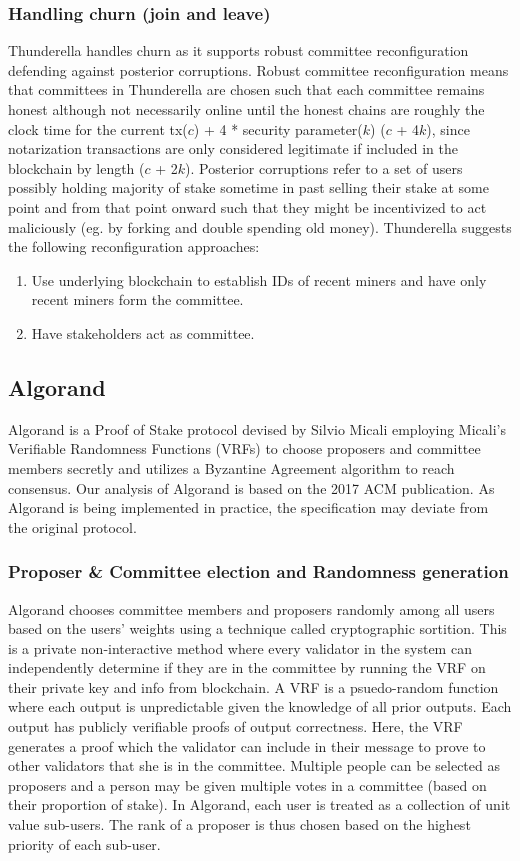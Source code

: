 \documentclass[10pt,journal,compsoc]{IEEEtran}
\newcommand\alberto[1]{\todo[color=yellow,inline]{\textbf{Alberto:} #1}}
\begin{document}
\subsubsection{Handling churn (join and leave)}
Thunderella handles churn as it supports robust committee reconfiguration defending against posterior corruptions. Robust committee reconfiguration means that committees in Thunderella are chosen such that each committee remains honest although not necessarily online until the honest chains are roughly the clock time for the current tx($c$) + 4 * security parameter($k$) ($c$ + 4$k$), since notarization transactions are only considered legitimate if included in the blockchain by length ($c$ + 2$k$). Posterior corruptions refer to a set of users possibly holding majority of stake sometime in past selling their stake at some point and from that point onward such that they might be incentivized to act maliciously (eg. by forking and double spending old money). \alberto{This last sentence should be explained before.} Thunderella suggests the following reconfiguration approaches: 
\begin{enumerate}
    \item Use underlying blockchain to establish IDs of recent miners and have only recent miners form the committee. 
    \item Have stakeholders act as committee.
\end{enumerate}

\subsection{Algorand}
Algorand \cite{Gilad} is a Proof of Stake protocol devised by Silvio Micali employing Micali's Verifiable Randomness Functions (VRFs) to choose proposers and committee members secretly and utilizes a Byzantine Agreement algorithm to reach consensus. Our analysis of Algorand is based on the 2017 ACM publication. As Algorand is being implemented in practice, the specification may deviate from the original protocol.

\subsubsection{Proposer \& Committee election and Randomness generation}
Algorand chooses committee members and proposers randomly among all users based on the users’ weights using a technique called cryptographic sortition. This is a private non-interactive method where every validator in the system can independently determine if they are in the committee by running the VRF on their private key and info from blockchain. A VRF is a psuedo-random function where each output is unpredictable given the knowledge of all prior outputs. Each output has publicly verifiable proofs of output correctness. Here, the VRF generates a proof which the validator can include in their message to prove to other validators that she is in the committee. Multiple people can be selected as proposers and a person may be given multiple votes in a committee (based on their proportion of stake). In Algorand, each user is treated as a collection of unit value sub-users. The rank of a proposer is thus chosen based on the highest priority of each sub-user.
\end{document}
